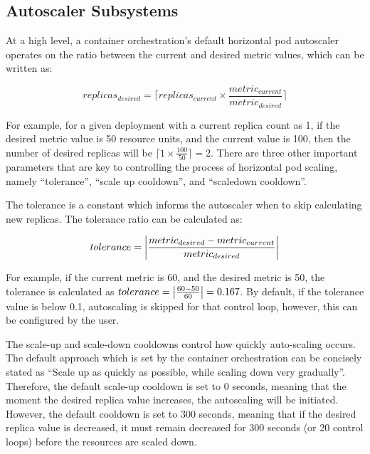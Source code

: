 \subsection{Autoscaler Subsystems}
\label{subsec:ch4-hybrid-arch}

At a high level, a container orchestration's default horizontal pod autoscaler operates on the ratio between the current and desired metric values, which can be written as:

\begin{equation}
    replicas_{desired} = \lceil replicas_{current} \times \frac{metric_{current}}{metric_{desired}}\rceil
    \label{eqn:replica-desired}
\end{equation}

For example, for a given deployment with a current replica count as 1, if the desired metric value is 50 resource units, and the current value is 100, then the number of desired replicas will be $\lceil 1 \times \frac{100}{50}\rceil = 2$. There are three other important parameters that are key to controlling the process of horizontal pod scaling, namely ``tolerance'', ``scale up cooldown'', and ``scaledown cooldown''.\par

The tolerance is a constant which informs the autoscaler when to skip calculating new replicas. The tolerance ratio can be calculated as:

\begin{equation}
    \label{eqn:tolerance}
    tolerance = \abs{ \frac{metric_{desired} - metric_{current}}{metric_{desired}} }
\end{equation}

For example, if the current metric is 60, and the desired metric is 50, the tolerance is calculated as $ tolerance = \abs{ \frac{60 - 50}{60}} = 0.167$. By default, if the tolerance value is below 0.1, autoscaling is skipped for that control loop, however, this can be configured by the user.\par

The scale-up and scale-down cooldowns control how quickly auto-scaling occurs. The default approach which is set by the container orchestration can be concisely stated as ``Scale up as quickly as possible, while scaling down very gradually''. Therefore, the default scale-up cooldown is set to 0 seconds, meaning that the moment the desired replica value increases, the autoscaling will be initiated. However, the default cooldown is set to 300 seconds, meaning that if the desired replica value is decreased, it must remain decreased for 300 seconds (or 20 control loops) before the resources are scaled down.\par

